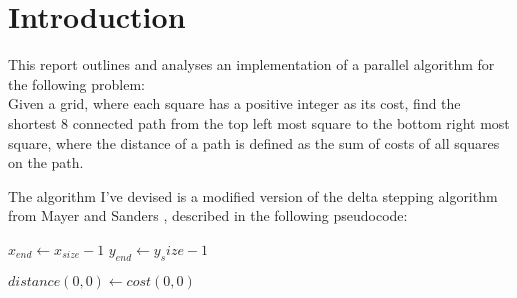 \documentclass{article}
\begin{document}
\section*{Introduction}

This report outlines and analyses an implementation of a parallel algorithm for the following
problem:\\
Given a grid, where each square has a positive integer as its cost, find the shortest 8 connected
path from the top left most square to the bottom right most square, where the distance of a path is
defined as the sum of costs of all squares on the path.

The algorithm I've devised is a modified version of the delta stepping algorithm from Mayer and
Sanders \cite{Meyer-1998}, described in the following pseudocode:
\begin{algorithm}
	\begin{algorithmic}
		\State \(x_{end}\gets x_{size} - 1\)
		\State \(y_{end}\gets y_size - 1\)

		\State \(distance(0, 0)\gets cost(0, 0)\)
	\end{algorithmic}
\end{algorithm}


\printbibliography
\end{document}
